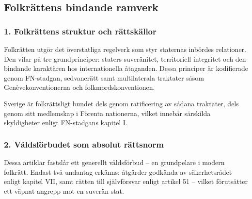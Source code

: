 %
%


\subsection{Folkrättens bindande ramverk}
\label{subsec:folkrattens_bindande_ramverk}

\subsubsection*{1. Folkrättens struktur och rättskällor}

Folkrätten utgör det överstatliga regelverk som styr staternas inbördes relationer. 
Den vilar på tre grundprinciper: staters suveränitet, territoriell integritet och den 
bindande karaktären hos internationella åtaganden. Dessa principer är kodifierade genom FN-stadgan, 
sedvanerätt samt multilaterala traktater såsom Genèvekonventionerna och folkmordskonventionen.

Sverige är folkrättsligt bundet dels genom ratificering av sådana traktater, dels genom sitt 
medlemskap i Förenta nationerna, vilket innebär särskilda skyldigheter enligt FN-stadgans kapitel I.

\subsubsection*{2. Våldsförbudet som absolut rättsnorm}


Dessa artiklar fastslår ett generellt våldsförbud – en grundpelare i modern folkrätt. 
Endast två undantag erkänns: åtgärder godkända av säkerhetsrådet enligt kapitel VII, samt 
rätten till självförsvar enligt artikel 51 – vilket förutsätter ett väpnat angrepp mot en suverän stat.

